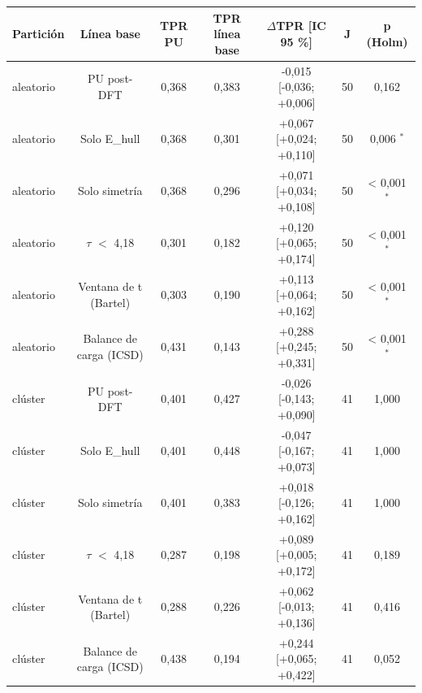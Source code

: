 \begin{tabular}{lcccccc}
\toprule
Partición & Línea base & TPR PU & TPR línea base & $\Delta$TPR [IC 95 \%] & J & p (Holm) \\
\midrule
aleatorio & PU post-DFT & 0,368 & 0,383 & -0,015 [-0,036; +0,006] & 50 & 0,162 \\
aleatorio & Solo E\_hull & 0,368 & 0,301 & +0,067 [+0,024; +0,110] & 50 & 0,006 $^{*}$ \\
aleatorio & Solo simetría & 0,368 & 0,296 & +0,071 [+0,034; +0,108] & 50 & < 0,001 $^{*}$ \\
aleatorio & $\tau$ $<$ 4,18 & 0,301 & 0,182 & +0,120 [+0,065; +0,174] & 50 & < 0,001 $^{*}$ \\
aleatorio & Ventana de t (Bartel) & 0,303 & 0,190 & +0,113 [+0,064; +0,162] & 50 & < 0,001 $^{*}$ \\
aleatorio & Balance de carga (ICSD) & 0,431 & 0,143 & +0,288 [+0,245; +0,331] & 50 & < 0,001 $^{*}$ \\
clúster & PU post-DFT & 0,401 & 0,427 & -0,026 [-0,143; +0,090] & 41 & 1,000 \\
clúster & Solo E\_hull & 0,401 & 0,448 & -0,047 [-0,167; +0,073] & 41 & 1,000 \\
clúster & Solo simetría & 0,401 & 0,383 & +0,018 [-0,126; +0,162] & 41 & 1,000 \\
clúster & $\tau$ $<$ 4,18 & 0,287 & 0,198 & +0,089 [+0,005; +0,172] & 41 & 0,189 \\
clúster & Ventana de t (Bartel) & 0,288 & 0,226 & +0,062 [-0,013; +0,136] & 41 & 0,416 \\
clúster & Balance de carga (ICSD) & 0,438 & 0,194 & +0,244 [+0,065; +0,422] & 41 & 0,052 \\
\bottomrule
\end{tabular}
